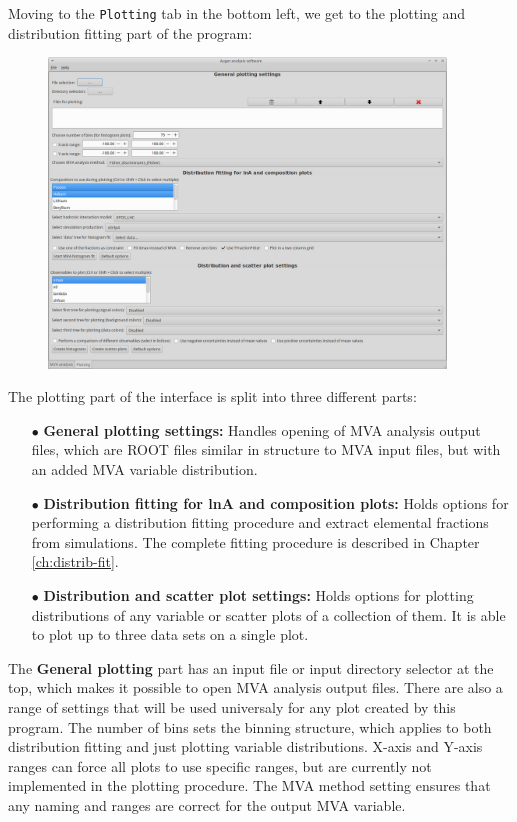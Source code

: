 \documentclass[12pt,a4paper]{report}
\begin{document}
{\noindent}Moving to the \texttt{Plotting} tab in the bottom left, we get to the plotting and distribution fitting part of the program:
\begin{figure}[H]
\centerline{\includegraphics[width=0.94\textwidth]{figures/software_screenshot_2.png}}
\end{figure}
{\noindent}The plotting part of the interface is split into three different parts:
\begin{itemize}
\item[$\bullet$] \textbf{General plotting settings:} Handles opening of MVA analysis output files, which are ROOT files similar in structure to MVA input files, but with an added MVA variable distribution.
\item[$\bullet$] \textbf{Distribution fitting for lnA and composition plots:} Holds options for performing a distribution fitting procedure and extract elemental fractions from simulations. The complete fitting procedure is described in Chapter \ref{ch:distrib-fit}.
\item[$\bullet$] \textbf{Distribution and scatter plot settings:} Holds options for plotting distributions of any variable or scatter plots of a collection of them. It is able to plot up to three data sets on a single plot.
\end{itemize}
The \textbf{General plotting} part has an input file or input directory selector at the top, which makes it possible to open MVA analysis output files. There are also a range of settings that will be used universaly for any plot created by this program. The number of bins sets the binning structure, which applies to both distribution fitting and just plotting variable distributions. X-axis and Y-axis ranges can force all plots to use specific ranges, but are currently not implemented in the plotting procedure. The MVA method setting ensures that any naming and ranges are correct for the output MVA variable.\\
\end{document}
